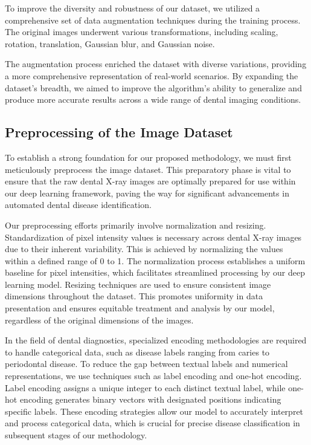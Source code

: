 \documentclass[journal,twoside,web]{ieeecolor}
\begin{document}
To improve the diversity and robustness of our dataset, we utilized a comprehensive set of data augmentation techniques during the training process. The original images underwent various transformations, including scaling, rotation, translation, Gaussian blur, and Gaussian noise.

The augmentation process enriched the dataset with diverse variations, providing a more comprehensive representation of real-world scenarios. By expanding the dataset's breadth, we aimed to improve the algorithm's ability to generalize and produce more accurate results across a wide range of dental imaging conditions.


\subsection{Preprocessing of the Image Dataset}

To establish a strong foundation for our proposed methodology, we must first meticulously preprocess the image dataset. This preparatory phase is vital to ensure that the raw dental X-ray images are optimally prepared for use within our deep learning framework, paving the way for significant advancements in automated dental disease identification.

Our preprocessing efforts primarily involve normalization and resizing. Standardization of pixel intensity values is necessary across dental X-ray images due to their inherent variability. This is achieved by normalizing the values within a defined range of 0 to 1. The normalization process establishes a uniform baseline for pixel intensities, which facilitates streamlined processing by our deep learning model. Resizing techniques are used to ensure consistent image dimensions throughout the dataset. This promotes uniformity in data presentation and ensures equitable treatment and analysis by our model, regardless of the original dimensions of the images.

In the field of dental diagnostics, specialized encoding methodologies are required to handle categorical data, such as disease labels ranging from caries to periodontal disease. To reduce the gap between textual labels and numerical representations, we use techniques such as label encoding and one-hot encoding. Label encoding assigns a unique integer to each distinct textual label, while one-hot encoding generates binary vectors with designated positions indicating specific labels. These encoding strategies allow our model to accurately interpret and process categorical data, which is crucial for precise disease classification in subsequent stages of our methodology.
\end{document}
